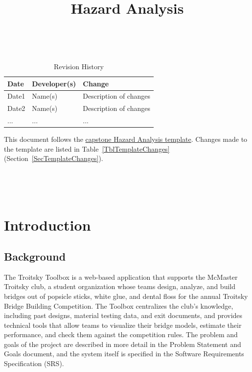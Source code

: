 \documentclass{article}
\title{Hazard Analysis\\\progname}
\author{\authname}
\date{}
\begin{document}
\maketitle
\thispagestyle{empty}

~\newpage


\begin{table}[hp]
\caption{Revision History} \label{TblRevisionHistory}
\begin{tabularx}{\textwidth}{llX}
\toprule
\textbf{Date} & \textbf{Developer(s)} & \textbf{Change}\\
\midrule
Date1 & Name(s) & Description of changes\\
Date2 & Name(s) & Description of changes\\
... & ... & ...\\
\bottomrule
\end{tabularx}
\end{table}

This document follows the
\href{https://github.com/smiths/capTemplate/tree/main/docs/HazardAnalysis}{capstone
Hazard Analysis template}. Changes made to the template are listed in
Table~\ref{TblTemplateChanges} (Section~\ref{SecTemplateChanges}).

~\newpage

\tableofcontents

~\newpage




\section{Introduction}

\subsection{Background}

The Troitsky Toolbox is a web-based application that supports the McMaster
Troitsky club, a student organization whose teams design, analyze, and build
bridges out of popsicle sticks, white glue, and dental floss for the annual
Troitsky Bridge Building Competition. The Toolbox centralizes the club's
knowledge, including past designs, material testing data, and exit documents,
and provides technical tools that allow teams to visualize their bridge models,
estimate their performance, and check them against the competition rules. The
problem and goals of the project are described in more detail in the Problem
Statement and Goals document, and the system itself is specified in the
Software Requirements Specification (SRS).
\end{document}
